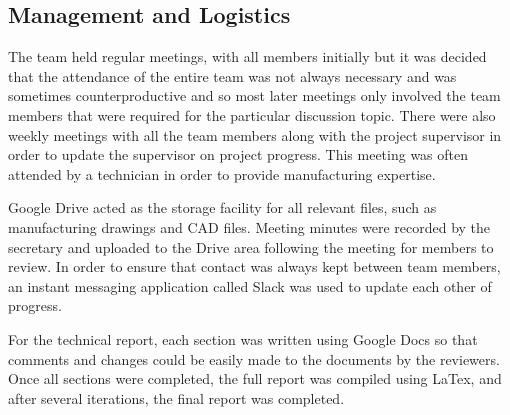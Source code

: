 \subsection{Management and Logistics}
The team held regular meetings, with all members initially but it was decided that the attendance of the entire team was not always necessary and was sometimes counterproductive and so most later meetings only involved the team members that were required for the particular discussion topic. There were also weekly meetings with all the team members along with the project supervisor in order to update the supervisor on project progress. This meeting was often attended by a technician in order to provide manufacturing expertise. \par
Google Drive acted as the storage facility for all relevant files, such as manufacturing drawings and CAD files. Meeting minutes were recorded by the secretary and uploaded to the Drive area following the meeting for members to review. In order to ensure that contact was always kept between team members, an instant messaging application called Slack was used to update each other of progress. \par
For the technical report, each section was written using Google Docs so that comments and changes could be easily made to the documents by the reviewers. Once all sections were completed, the full report was compiled using LaTex, and after several iterations, the final report was completed.